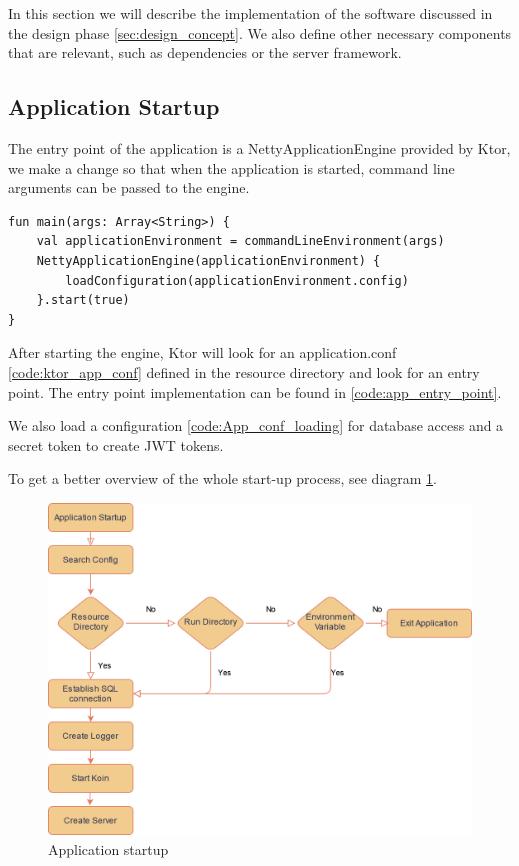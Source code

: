 In this section we will describe the implementation of the software discussed in the design phase \ref{sec:design_concept}. We also define other necessary components that are relevant, such as dependencies or the server framework. 

\subsection{Application Startup}

The entry point of the application is a NettyApplicationEngine provided by Ktor, we make a change so that when the application is started, command line arguments can be passed to the engine.

\begin{verbatim}
fun main(args: Array<String>) {
    val applicationEnvironment = commandLineEnvironment(args)
    NettyApplicationEngine(applicationEnvironment) {
        loadConfiguration(applicationEnvironment.config)
    }.start(true)
}
\end{verbatim}

After starting the engine, Ktor will look for an application.conf \ref{code:ktor_app_conf} defined in the resource directory and look for an entry point. The entry point implementation can be found in \ref{code:app_entry_point}.

We also load a configuration \ref{code:App_conf_loading} for database access and a secret token to create JWT tokens.

To get a better overview of the whole start-up process, see diagram \ref{fig:startup}.

\begin{figure}[h!]
\centering
\includegraphics[width=\textwidth]{images/StartupBachelor.drawio.png}
\caption{\label{fig:startup}Application startup}
\end{figure}

